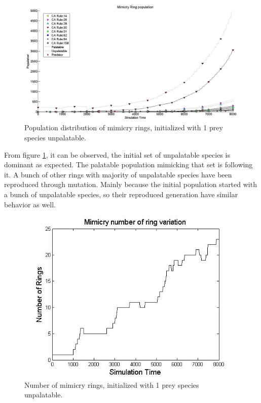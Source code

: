 \begin{figure}[H]
	\centering
	\includegraphics[scale=0.40]{images/simTime8k-1Prey-unp}
	\caption[Population distribution of mimicry rings (1 prey species unpalatable)]{Population distribution of mimicry rings, initialized with 1 prey species unpalatable.}
	\label{fig:plot-1-prey-unp}
\end{figure}

From figure \ref{fig:plot-1-prey-unp}, it can be observed, the initial set of unpalatable species is dominant as expected. The palatable population mimicking that set is following it. A bunch of other rings with majority of unpalatable species have been reproduced through mutation. Mainly because the initial population started with a bunch of unpalatable species, so their reproduced generation have similar behavior as well.

\begin{figure}[H]
	\centering
	\includegraphics[scale=0.50]{images/ringSize8k-1Prey-unp}
	\caption[Number of mimicry rings (1 prey species unpalatable)]{Number of mimicry rings, initialized with 1 prey species unpalatable.}
	\label{fig:ringSize8k-1-Prey-unp}
\end{figure}

